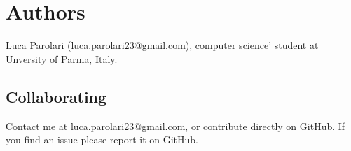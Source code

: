 

\section{Authors}
Luca Parolari (luca.parolari23@gmail.com), computer science' student at Unversity of Parma, Italy.

\subsection{Collaborating}
Contact me at luca.parolari23@gmail.com, or contribute directly on GitHub.
If you find an issue please report it on GitHub.

